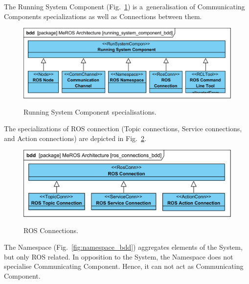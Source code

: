 \documentclass[11pt,oneside,a4paper]{report}
\begin{document}
	The Running System Component (Fig.~\ref{fig:running_system_component_bdd}) is a~generalisation of Communicating Components specializations as well as Connections between them. 
	

	\begin{figure}[H]
		\centering
		\begin{center}
			{\includegraphics[scale=1.0]{diagrams/running_system_component_bdd.png}}
		\end{center}
		\caption{Running System Component specialisations.} 
		\label{fig:running_system_component_bdd}
	\end{figure} 
	 	 
	 \pagebreak	 
	 	 
	 The specializations of ROS connection (Topic connections, Service connections, and Action connections) are depicted in Fig.~\ref{fig:ros_connections_bdd}. 
	
	
	\begin{figure}[H]
		\centering
		\begin{center}
			{\includegraphics[scale=.94]{diagrams/ros_connections_bdd.png}}
		\end{center}
		\caption{ROS Connections.} 
		\label{fig:ros_connections_bdd}
	\end{figure}

	
	The Namespace (Fig.~\ref{fig:namespace_bdd}) aggregates elements of the System, but only ROS related. In opposition to the System, the Namespace does not specialise Communicating Component. Hence, it can not act as Communicating Component.
	
\end{document}
